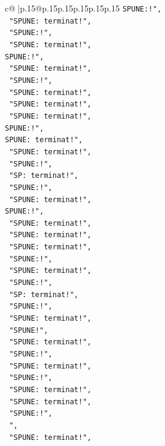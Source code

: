 \documentclass{article}
\begin{document}
{\begin{supertabular}{c@{$\;$}|p{.15\linewidth}@{}p{.15\linewidth}p{.15\linewidth}p{.15\linewidth}p{.15\linewidth}p{.15\linewidth}}
{{{\texttt{SPUNE:!",} \\
\texttt{    "SPUNE: terminat!",} \\
\texttt{    "SPUNE:!",} \\
\texttt{    "SPUNE: terminat!",} \\
\texttt{SPUNE:!",} \\
\texttt{    "SPUNE: terminat!",} \\
\texttt{    "SPUNE:!",} \\
\texttt{    "SPUNE: terminat!",} \\
\texttt{    "SPUNE: terminat!",} \\
\texttt{    "SPUNE: terminat!",} \\
\texttt{SPUNE:!",} \\
\texttt{SPUNE: terminat!",} \\
\texttt{    "SPUNE: terminat!",} \\
\texttt{    "SPUNE:!",} \\
\texttt{    "SP: terminat!",} \\
\texttt{    "SPUNE:!",} \\
\texttt{    "SPUNE: terminat!",} \\
\texttt{SPUNE:!",} \\
\texttt{    "SPUNE: terminat!",} \\
\texttt{    "SPUNE: terminat!",} \\
\texttt{    "SPUNE: terminat!",} \\
\texttt{    "SPUNE:!",} \\
\texttt{    "SPUNE: terminat!",} \\
\texttt{    "SPUNE:!",} \\
\texttt{    "SP: terminat!",} \\
\texttt{    "SPUNE:!",} \\
\texttt{    "SPUNE: terminat!",} \\
\texttt{    "SPUNE!",} \\
\texttt{    "SPUNE: terminat!",} \\
\texttt{    "SPUNE:!",} \\
\texttt{    "SPUNE: terminat!",} \\
\texttt{    "SPUNE:!",} \\
\texttt{    "SPUNE: terminat!",} \\
\texttt{    "SPUNE: terminat!",} \\
\texttt{    "SPUNE:!",} \\
\texttt{   ",} \\
\texttt{    "SPUNE: terminat!",} \\
}}}
\end{supertabular}}
\end{document}
